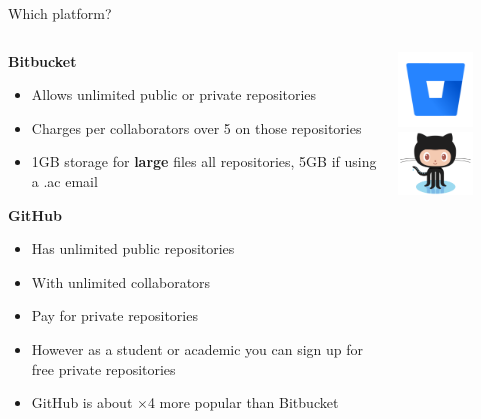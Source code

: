 \documentclass[10pt]{beamer}
\begin{document}
{\begin{frame}[fragile]{Which platform?}
\begin{columns}[T]
\begin{column}{.8\textwidth}
\textbf{Bitbucket}
\begin{itemize}
\item Allows unlimited public or private repositories
\item Charges per collaborators over 5 on those repositories 
\item 1GB storage for \textbf{large} files all repositories, 5GB if using a .ac email
\end{itemize}
\textbf{GitHub}
\begin{itemize}
\item Has unlimited public repositories 
\item With unlimited collaborators
\item Pay for private repositories
\item However as a student or academic you can sign up for free private repositories
\item GitHub is about $\times$4 more popular than Bitbucket
\end{itemize}
\end{column}
\begin{column}{.2\textwidth}
\includegraphics[width=2cm]{Figs/git/Bitbucket} \newline \newline \newline \newline 
\includegraphics[width=2cm]{Figs/git/Octocat}
\end{column}
\end{columns}
\end{frame}


}
\end{document}
